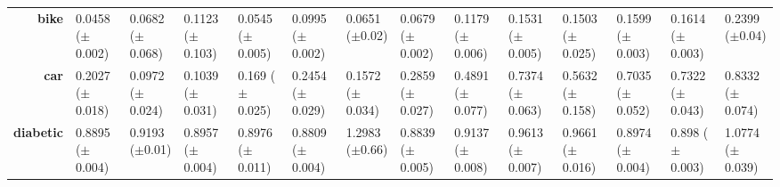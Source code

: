 \begin{sidewaystable}[htbp]
{\begin{tabular}{r|lll|l|l|l|l|l|lllll}
			\textbf{bike}                       & \cellcolor[rgb]{ .388,  .745,  .482}0.0458 ($\pm$0.002)                        & \cellcolor[rgb]{ .592,  .804,  .494}0.0682 ($\pm$0.068) & \cellcolor[rgb]{ 1,  .922,  .518}0.1123 ($\pm$0.103)    & \cellcolor[rgb]{ .467,  .765,  .486}0.0545 ($\pm$0.005) & \cellcolor[rgb]{ .882,  .886,  .51}0.0995 ($\pm$0.002)  & \cellcolor[rgb]{ .565,  .796,  .49}0.0651 ($\pm$0.02)   & \cellcolor[rgb]{ .588,  .8,  .49}0.0679 ($\pm$0.002)    & \cellcolor[rgb]{ 1,  .902,  .514}0.1179 ($\pm$0.006)    & \cellcolor[rgb]{ .992,  .761,  .486}0.1531 ($\pm$0.005) & \cellcolor[rgb]{ .992,  .773,  .49}0.1503 ($\pm$0.025)  & \cellcolor[rgb]{ .992,  .733,  .482}0.1599 ($\pm$0.003) & \cellcolor[rgb]{ .992,  .725,  .482}0.1614 ($\pm$0.003) & \cellcolor[rgb]{ .973,  .412,  .42}0.2399 ($\pm$0.04)   \\
			\textbf{car}                        & \cellcolor[rgb]{ .729,  .843,  .502}0.2027 ($\pm$0.018)                        & \cellcolor[rgb]{ .388,  .745,  .482}0.0972 ($\pm$0.024) & \cellcolor[rgb]{ .408,  .749,  .482}0.1039 ($\pm$0.031) & \cellcolor[rgb]{ .62,  .812,  .494}0.169 ($\pm$0.025)   & \cellcolor[rgb]{ .867,  .882,  .51}0.2454 ($\pm$0.029)  & \cellcolor[rgb]{ .58,  .8,  .49}0.1572 ($\pm$0.034)     & \cellcolor[rgb]{ 1,  .922,  .518}0.2859 ($\pm$0.027)    & \cellcolor[rgb]{ .992,  .733,  .482}0.4891 ($\pm$0.077) & \cellcolor[rgb]{ .98,  .502,  .439}0.7374 ($\pm$0.063)  & \cellcolor[rgb]{ .988,  .667,  .471}0.5632 ($\pm$0.158) & \cellcolor[rgb]{ .98,  .533,  .443}0.7035 ($\pm$0.052)  & \cellcolor[rgb]{ .98,  .506,  .439}0.7322 ($\pm$0.043)  & \cellcolor[rgb]{ .973,  .412,  .42}0.8332 ($\pm$0.074)  \\
			\textbf{diabetic}                   & \cellcolor[rgb]{ .694,  .831,  .498}0.8895 ($\pm$0.004)                        & \cellcolor[rgb]{ 1,  .898,  .514}0.9193 ($\pm$0.01)     & \cellcolor[rgb]{ .918,  .894,  .51}0.8957 ($\pm$0.004)  & \cellcolor[rgb]{ .98,  .914,  .514}0.8976 ($\pm$0.011)  & \cellcolor[rgb]{ .388,  .745,  .482}0.8809 ($\pm$0.004) & \cellcolor[rgb]{ .973,  .412,  .42}1.2983 ($\pm$0.66)   & \cellcolor[rgb]{ .49,  .773,  .486}0.8839 ($\pm$0.005)  & \cellcolor[rgb]{ 1,  .902,  .518}0.9137 ($\pm$0.008)    & \cellcolor[rgb]{ .996,  .843,  .506}0.9613 ($\pm$0.007) & \cellcolor[rgb]{ .996,  .835,  .502}0.9661 ($\pm$0.016) & \cellcolor[rgb]{ .976,  .914,  .514}0.8974 ($\pm$0.004) & \cellcolor[rgb]{ 1,  .922,  .518}0.898 ($\pm$0.003)     & \cellcolor[rgb]{ .988,  .694,  .475}1.0774 ($\pm$0.039) \\

\end{tabular}}
\end{sidewaystable}
